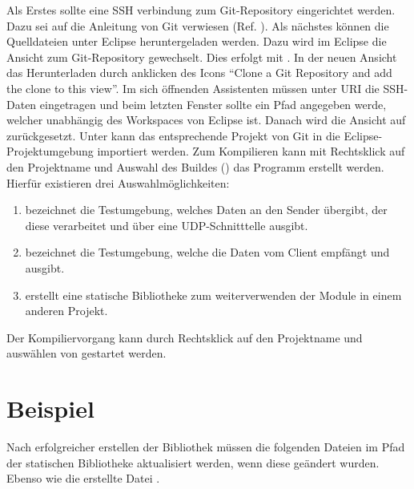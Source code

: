 Als Erstes sollte eine SSH verbindung zum Git-Repository eingerichtet werden.
Dazu sei auf die Anleitung von Git verwiesen
(Ref. \cite{web7}). Als n{\"a}chstes k{\"o}nnen
die Quelldateien unter Eclipse heruntergeladen werden. Dazu wird im Eclipse die
Ansicht zum Git-Repository gewechselt. Dies erfolgt mit . In der neuen Ansicht das Herunterladen durch anklicken des
Icons "`Clone a Git Repository and add the clone to this view"'. Im sich {\"o}ffnenden
Assistenten m{\"u}ssen unter URI die SSH-Daten
 eingetragen und
beim letzten Fenster sollte ein Pfad angegeben werde, welcher
unabh{\"a}ngig des Workspaces von Eclipse ist.\newline
Danach wird die Ansicht auf 
zur{\"u}ckgesetzt. Unter  kann das entsprechende Projekt von Git
in die Eclipse-Projektumgebung importiert werden. Zum Kompilieren kann
mit Rechtsklick auf den Projektname und Auswahl des Buildes () das Programm erstellt werden. Hierf{\"u}r existieren
drei Auswahlm{\"o}glichkeiten:

\begin{enumerate}
\item {} bezeichnet die Testumgebung, welches
Daten an den Sender {\"u}bergibt, der diese verarbeitet und {\"u}ber eine
\gls{UDP}-Schnitttelle ausgibt.
\item {} bezeichnet die Testumgebung, welche die
Daten vom Client empf{\"a}ngt und ausgibt.
\item {} erstellt eine statische Bibliotheke zum weiterverwenden der
Module in einem anderen Projekt.
\end{enumerate}

Der Kompiliervorgang kann durch Rechtsklick auf den Projektname und ausw{\"a}hlen
von  gestartet werden.

\section{Beispiel}

Nach erfolgreicher erstellen der Bibliothek m{\"u}ssen die folgenden Dateien
im Pfad  der statischen Bibliotheke aktualisiert werden,
wenn diese ge{\"a}ndert wurden. Ebenso wie die erstellte Datei
.

